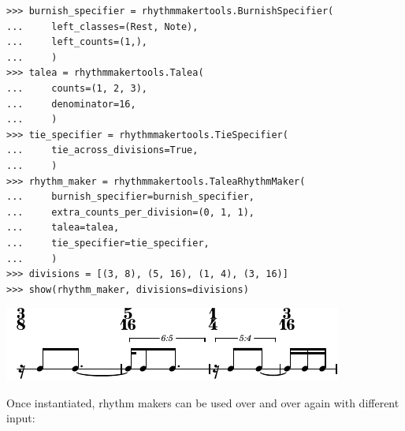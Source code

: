 \documentclass{article}
\begin{document}
\begin{lstlisting}
>>> burnish_specifier = rhythmmakertools.BurnishSpecifier(
...     left_classes=(Rest, Note),
...     left_counts=(1,),
...     )
>>> talea = rhythmmakertools.Talea(
...     counts=(1, 2, 3),
...     denominator=16,
...     )
>>> tie_specifier = rhythmmakertools.TieSpecifier(
...     tie_across_divisions=True,
...     )
>>> rhythm_maker = rhythmmakertools.TaleaRhythmMaker(
...     burnish_specifier=burnish_specifier,
...     extra_counts_per_division=(0, 1, 1),
...     talea=talea,
...     tie_specifier=tie_specifier,
...     )
>>> divisions = [(3, 8), (5, 16), (1, 4), (3, 16)]
>>> show(rhythm_maker, divisions=divisions)
\end{lstlisting}
\includegraphics{assets/lilypond-c238b5fdf445554d95cebd52911b461e.pdf}

\noindent Once instantiated, rhythm makers can be used over and over again with
different input:

\end{document}
